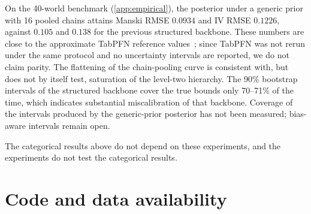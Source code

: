\documentclass[11pt]{article}
\theoremstyle{definition}
\theoremstyle{remark}
\begin{document}
On the 40-world benchmark (\cref{app:empirical}), the posterior under a generic prior with 16 pooled
chains attains Manski RMSE $0.0934$ and IV RMSE $0.1226$, against $0.105$ and $0.138$ for the
previous structured backbone. These numbers are close to the approximate TabPFN reference
values~\cite{Hollmann2023}; since TabPFN was not rerun under the same protocol and no uncertainty
intervals are reported, we do not claim parity. The flattening of the chain-pooling curve is
consistent with, but does not by itself test, saturation of the level-two hierarchy. The 90\%
bootstrap intervals of the structured backbone cover the true bounds only 70--71\% of the time, which
indicates substantial miscalibration of that backbone. Coverage of the intervals produced by the
generic-prior posterior has not been measured; bias-aware intervals remain open.

The categorical results above do not depend on these experiments, and the experiments do not test
the categorical results.

\section{Code and data availability}\label{sec:code-data}
\end{document}
